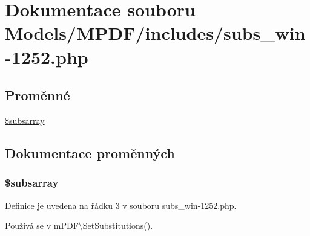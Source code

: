 \hypertarget{subs__win-1252_8php}{\section{Dokumentace souboru Models/\-M\-P\-D\-F/includes/subs\-\_\-win-\/1252.php}
\label{subs__win-1252_8php}
}
\subsection*{Proměnné}
\begin{DoxyCompactItemize}
\item 
\hyperlink{subs__win-1252_8php_ad34c431a6e764950e21a9d328e83657f}{\$subsarray}
\end{DoxyCompactItemize}


\subsection{Dokumentace proměnných}
\hypertarget{subs__win-1252_8php_ad34c431a6e764950e21a9d328e83657f}{
\subsubsection[{\$subsarray}]{\setlength{\rightskip}{0pt plus 5cm}\$subsarray}}\label{subs__win-1252_8php_ad34c431a6e764950e21a9d328e83657f}


Definice je uvedena na řádku 3 v souboru subs\-\_\-win-\/1252.\-php.



Používá se v m\-P\-D\-F\textbackslash{}\-Set\-Substitutions().

